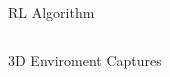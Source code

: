 \documentclass[final]{beamer}
\newlength{\onecolwid}
\newlength{\twocolwid}
\begin{document}
\begin{frame}[t]
\begin{columns}[t]
\begin{column}{\twocolwid}
\begin{columns}[t,totalwidth=\twocolwid]
\begin{column}{\onecolwid}
\begin{block}{RL Algorithm}
\end{block}


\end{column} %

\end{columns} %


\begin{alertblock}{3D Enviroment Captures}


\end{alertblock}
\end{column}
\end{columns}
\end{frame}
\end{document}
